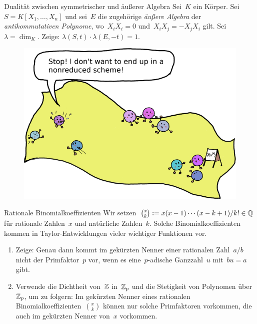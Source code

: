 \documentclass{uebblatt}
\begin{document}
\begin{aufgabe}{1}{Dualität zwischen symmetrischer und äußerer Algebra}
Sei~$K$ ein Körper. Sei~$S = K[X_1,\ldots,X_n]$ und sei~$E$ die zugehörige \emph{äußere Algebra}
der \emph{antikommutativen Polynome}, wo~$X_i X_i = 0$ und~$X_i X_j =
-X_j X_i$ gilt. Sei~$\lambda = \dim_K$.
Zeige: $\lambda(S, t) \cdot \lambda(E, -t) = 1$.
\end{aufgabe}

\setlength{\wrapoverhang}{1.3cm}
\setlength{\columnsep}{0.8cm}
\begin{figure}
  \vspace{-1em}
  \includegraphics{images/hilbert-scheme-of-points}
\end{figure}

\begin{aufgabe}{0}{Rationale Binomialkoeffizienten}
\scriptsize
Wir setzen~$\binom{x}{k}
\vcentcolon= x (x-1) \cdots (x-k+1) / k! \in \mathbb{Q}$ für rationale Zahlen~$x$ und
natürliche Zahlen~$k$.
Solche Binomialkoeffizienten
kommen in Taylor-Entwicklungen vieler wichtiger Funktionen vor.
\begin{enumerate}
\item Zeige: Genau dann kommt im gekürzten Nenner einer rationalen Zahl~$a/b$
nicht der Primfaktor~$p$ vor, wenn es eine~$p$-adische Ganzzahl~$u$ mit~$bu = a$ gibt.
\item Verwende die Dichtheit von~$\mathbb{Z}$ in~$\mathbb{Z}_p$ und die Stetigkeit von
Polynomen über~$\mathbb{Z}_p$, um zu folgern: Im gekürzten Nenner eines rationalen
Binomialkoeffizienten~$\binom{x}{k}$ können nur solche Primfaktoren vorkommen, die auch
im gekürzten Nenner von~$x$ vorkommen.\par
\end{enumerate}
\end{aufgabe}
\end{document}
